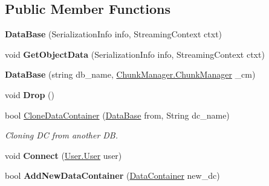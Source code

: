 \subsection*{Public Member Functions}
\begin{DoxyCompactItemize}
\item 
\hypertarget{class_dwarf_d_b_1_1_data_structures_1_1_data_base_a9748f9609030f61d1cfc28a162a48ad5}{
{\bfseries DataBase} (SerializationInfo info, StreamingContext ctxt)}
\label{class_dwarf_d_b_1_1_data_structures_1_1_data_base_a9748f9609030f61d1cfc28a162a48ad5}

\item 
\hypertarget{class_dwarf_d_b_1_1_data_structures_1_1_data_base_a34980ba6f61e15d6dcbe5af7f596a6fd}{
void {\bfseries GetObjectData} (SerializationInfo info, StreamingContext ctxt)}
\label{class_dwarf_d_b_1_1_data_structures_1_1_data_base_a34980ba6f61e15d6dcbe5af7f596a6fd}

\item 
\hypertarget{class_dwarf_d_b_1_1_data_structures_1_1_data_base_aa975c962d73ddc7a6def8bb9d4dba0ad}{
{\bfseries DataBase} (string db\_\-name, \hyperlink{class_dwarf_d_b_1_1_chunk_manager_1_1_chunk_manager}{ChunkManager.ChunkManager} \_\-cm)}
\label{class_dwarf_d_b_1_1_data_structures_1_1_data_base_aa975c962d73ddc7a6def8bb9d4dba0ad}

\item 
\hypertarget{class_dwarf_d_b_1_1_data_structures_1_1_data_base_ae169105e97a66c5d621b3d945d11fce4}{
void {\bfseries Drop} ()}
\label{class_dwarf_d_b_1_1_data_structures_1_1_data_base_ae169105e97a66c5d621b3d945d11fce4}

\item 
bool \hyperlink{class_dwarf_d_b_1_1_data_structures_1_1_data_base_af1cedf55fdab7efe9154ea7570c9abc9}{CloneDataContainer} (\hyperlink{class_dwarf_d_b_1_1_data_structures_1_1_data_base}{DataBase} from, String dc\_\-name)
\begin{DoxyCompactList}\small\item\em Cloning DC from another DB. \item\end{DoxyCompactList}\item 
\hypertarget{class_dwarf_d_b_1_1_data_structures_1_1_data_base_ae0180400ee59265e19a5d981f59ca440}{
void {\bfseries Connect} (\hyperlink{class_dwarf_d_b_1_1_user_1_1_user}{User.User} user)}
\label{class_dwarf_d_b_1_1_data_structures_1_1_data_base_ae0180400ee59265e19a5d981f59ca440}

\item 
\hypertarget{class_dwarf_d_b_1_1_data_structures_1_1_data_base_a251d5fa0ba9b21d911a9a1c5dcf33152}{
bool {\bfseries AddNewDataContainer} (\hyperlink{class_dwarf_d_b_1_1_data_structures_1_1_data_container}{DataContainer} new\_\-dc)}
\label{class_dwarf_d_b_1_1_data_structures_1_1_data_base_a251d5fa0ba9b21d911a9a1c5dcf33152}


\end{DoxyCompactItemize}
